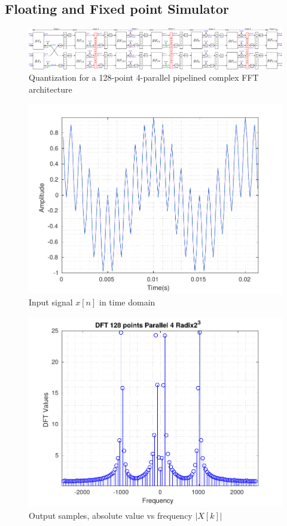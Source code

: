 \documentclass[journal,comsoc]{IEEEtran}
\begin{document}
\subsection{Floating and Fixed point Simulator}
\begin{figure}[t!]
	\centering
	\includegraphics[width=\linewidth]{Diagramas/miSeccionFiguras/4Paralelo128pRadix8Cuantizacion1.pdf}
	\caption{Quantization for a 128-point 4-parallel pipelined complex FFT architecture}
	\label{fig:4paralelo128pradix8cuantizacion1}
\end{figure}
\begin{figure}[t!]
	\centering
	\includegraphics[width=0.92\linewidth]{Diagramas/DftInputSignal.pdf}
	\caption{Input signal $x[n]$ in time domain}
	\label{fig:dftinputsignal}
\end{figure}
\begin{figure}[t!]
	\centering
	\includegraphics[width=0.95\linewidth]{Diagramas/DftFixedPoint.pdf}
	\caption{Output samples, absolute value vs frequency $|X[k]|$}
	\label{fig:dftfixedpoint}
\end{figure}
\end{document}
